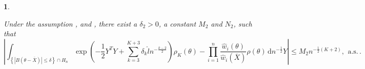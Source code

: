 \documentclass[oneside,english]{amsbook}
\numberwithin{section}{chapter}
\numberwithin{equation}{section}
\numberwithin{figure}{section}
\theoremstyle{plain}
\newtheorem{lem}{\protect\lemmaname}
\theoremstyle{plain}
\theoremstyle{definition}
\theoremstyle{plain}
\theoremstyle{plain}
\theoremstyle{remark}
\theoremstyle{definition}
\theoremstyle{definition}
\newcommand{\diff}{\,\mathrm{d}}
\newcommand{\ascv}{\,\mathrm{a.s.}\,}
\providecommand{\lemmaname}{Lemma}
\begin{document}
\begin{lem}
\label{lem:central-expansion-post-prod}%

Under the assumption , 
and , there exist a $\delta_{2}>0$, a constant
$M_{2}$ and $N_{2}$, such that 
\begin{equation}
\left|\int_{\left\{ \left|B\left(\theta-\overline{X}\right)\right|\le\delta\right\} \cap H_{n}}\exp\left(-\frac{1}{2}Y^{T}Y+\sum_{k=3}^{K+3}\delta_{k}\hat{l}n^{-\frac{k-2}{2}}\right)\rho_{K}\left(\theta\right)-\prod_{i=1}^{n}\frac{\hat{w}_{i}\left(\theta\right)}{\hat{w}_{i}\left(\overline{X}\right)}\rho\left(\theta\right)\diff n^{-\frac{1}{2}}Y\right|\le M_{2}n^{-\frac{1}{2}\left(K+2\right)},\:\ascv.\label{eq:central-exp-post}
\end{equation}
\end{lem}
\end{document}
